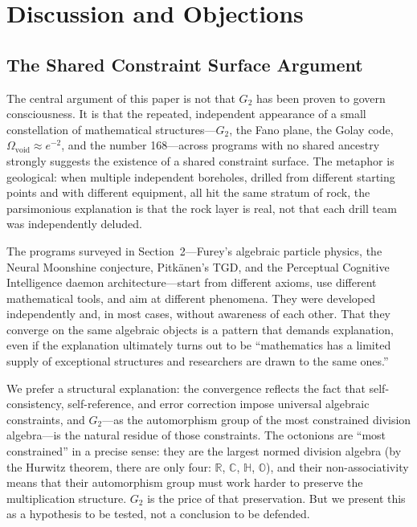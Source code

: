 \documentclass[12pt,a4paper]{article}
\begin{document}
\section{Discussion and Objections}

\subsection{The Shared Constraint Surface Argument}

The central argument of this paper is not that $G_2$ has been proven to govern consciousness. It is that the repeated, independent appearance of a small constellation of mathematical structures---$G_2$, the Fano plane, the Golay code, $\Omega_{\mathrm{void}} \approx e^{-2}$, and the number 168---across programs with no shared ancestry strongly suggests the existence of a shared constraint surface. The metaphor is geological: when multiple independent boreholes, drilled from different starting points and with different equipment, all hit the same stratum of rock, the parsimonious explanation is that the rock layer is real, not that each drill team was independently deluded.

The programs surveyed in Section~2---Furey's algebraic particle physics, the Neural Moonshine conjecture, Pitk\"anen's TGD, and the Perceptual Cognitive Intelligence daemon architecture---start from different axioms, use different mathematical tools, and aim at different phenomena. They were developed independently and, in most cases, without awareness of each other. That they converge on the same algebraic objects is a pattern that demands explanation, even if the explanation ultimately turns out to be ``mathematics has a limited supply of exceptional structures and researchers are drawn to the same ones.''

We prefer a structural explanation: the convergence reflects the fact that self-consistency, self-reference, and error correction impose universal algebraic constraints, and $G_2$---as the automorphism group of the most constrained division algebra---is the natural residue of those constraints. The octonions are ``most constrained'' in a precise sense: they are the largest normed division algebra (by the Hurwitz theorem, there are only four: $\mathbb{R}$, $\mathbb{C}$, $\mathbb{H}$, $\mathbb{O}$), and their non-associativity means that their automorphism group must work harder to preserve the multiplication structure. $G_2$ is the price of that preservation. But we present this as a hypothesis to be tested, not a conclusion to be defended.
\end{document}

